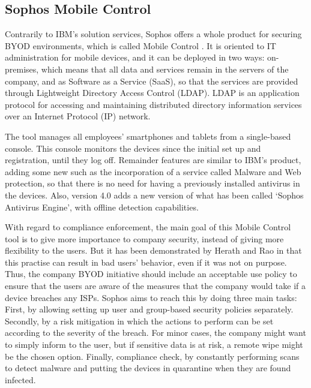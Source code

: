 
\subsection{Sophos Mobile Control}
\label{subsec:sophos}

Contrarily to IBM's solution services, Sophos offers a whole product for securing BYOD environments, which is called Mobile Control \cite{Sophos_tool}. It is oriented to IT administration for mobile devices, and it can be deployed in two ways: on-premises, which means that all data and services remain in the servers of the company, and as Software as a Service (SaaS), so that the services are provided through Lightweight Directory Access Control (LDAP). LDAP is an application protocol for accessing and maintaining distributed directory information services over an Internet Protocol (IP) network.

The tool manages all employees' smartphones and tablets from a single-based console. This console monitors the devices since the initial set up and registration, until they log off. Remainder features are similar to IBM's product, adding some new such as the incorporation of a service called Malware and Web protection, so that there is no need for having a previously installed antivirus in the devices. Also, version 4.0 adds a new version of what has been called `Sophos Antivirus Engine', with offline detection capabilities.

With regard to compliance enforcement, the main goal of this Mobile Control tool is to give more importance to company security, instead of giving more flexibility to the users. But it has been demonstrated by Herath and Rao in \cite{SecPolPenalty09} that this practise can result in bad users' behavior, even if it was not on purpose. Thus, the company BYOD initiative should include an acceptable use policy to ensure that the users are aware of the measures that the company would take if a device breaches any ISPs. Sophos aims to reach this by doing three main tasks: First, by allowing setting up user and group-based security policies separately. Secondly, by a risk mitigation in which the actions to perform can be set according to the severity of the breach. For minor cases, the company might want to simply inform to the user, but if sensitive data is at risk, a remote wipe might be the chosen option. Finally, compliance check, by constantly performing scans to detect malware and putting the devices in quarantine when they are found infected.

